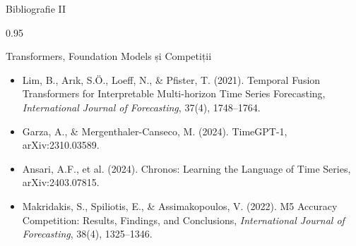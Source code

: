 \documentclass[9pt, aspectratio=169, t]{beamer}
\begin{document}
\begin{frame}{Bibliografie II}
    \begin{cminipage}{0.95\textwidth}
        \begin{block}{Transformers, Foundation Models și Competiții}
            {\small
            \begin{itemize}\setlength{\itemsep}{0pt}
                \item Lim, B., Ar{\i}k, S.\"O., Loeff, N., \& Pfister, T. (2021). Temporal Fusion Transformers for Interpretable Multi-horizon Time Series Forecasting, \textit{International Journal of Forecasting}, 37(4), 1748--1764.
                \item Garza, A., \& Mergenthaler-Canseco, M. (2024). TimeGPT-1, arXiv:2310.03589.
                \item Ansari, A.F., et al. (2024). Chronos: Learning the Language of Time Series, arXiv:2403.07815.
                \item Makridakis, S., Spiliotis, E., \& Assimakopoulos, V. (2022). M5 Accuracy Competition: Results, Findings, and Conclusions, \textit{International Journal of Forecasting}, 38(4), 1325--1346.
            \end{itemize}
            }
        \end{block}
    \end{cminipage}
\end{frame}
\end{document}
